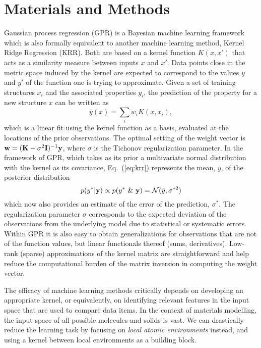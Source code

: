 \documentclass[12pt]{article}
\begin{document}
\section{Materials and Methods}

%
%
%
%

Gaussian process regression (GPR) is a Bayesian machine learning framework\cite{RasmussenBook} which is also
formally equivalent to another  machine  learning  method,
Kernel  Ridge  Regression (KRR).
Both are based on a kernel function $K(x,x')$ that acts as a similarity measure between inputs $x$ and $x'$. Data points close in the metric space induced by the kernel are expected to correspond to 
the values $y$ and $y'$ of the function one is trying to approximate.
Given a set of training structures $x_i$ and the associated properties $y_i$, the prediction of the property for a new structure $x$ 
can be written as 
\begin{equation}
\bar y(x) = \sum_i w_i K(x, x_i),
\label{eq:krr}
\end{equation}
which is  a linear fit using the kernel function as a basis, evaluated at the locations of the prior observations. The optimal setting of the weight vector is ${\bf w} = ({\bf K}+\sigma^2{\bf I})^{-1} {\bf y}$, where $\sigma$ 
is the Tichonov regularization parameter.
%
%
%
In the framework of GPR,
which takes as its prior a multivariate normal distribution with the kernel as its covariance, Eq.~(\ref{eq:krr}) 
represents the mean, $\bar y$, of the posterior distribution
\begin{equation}
p(y^* | {\bf y}) \propto p(y^*\ \&\ {\bf y}) = {\cal N}(\bar y, \sigma^{*2})
\end{equation}
which now also provides an estimate of the error of the prediction, $\sigma^*$. 
%
The regularization parameter $\sigma$ corresponds to the expected deviation of the
observations from the underlying model due to statistical or systematic errors. 
%
Within GPR it is also easy to obtain generalizations for observations that are not of the function values, but linear functionals thereof (sums, derivatives). Low-rank (sparse) approximations of the kernel matrix are straightforward and help reduce the computational burden of the matrix inversion in computing the weight vector\cite{candela+rasmussen}.

The efficacy of machine learning methods critically depends on developing an appropriate kernel, or equivalently, on identifying relevant features in the input space that are used to compare data items. In the context of materials modelling, the input space of all possible molecules and solids is vast. We can drastically reduce the learning task by focusing on {\em local atomic environments} instead, and using a kernel between local environments as a building block. 
\end{document}

